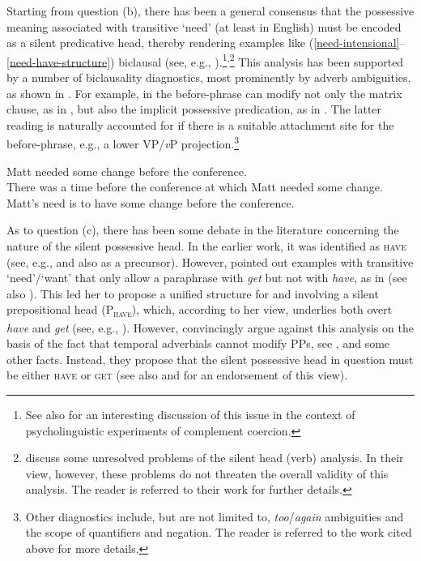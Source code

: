 \documentclass[output=paper]{langscibook}
\begin{document}
Starting from question (b), there has been a general consensus that the possessive meaning associated with transitive `need' (at least in English) must be encoded as a silent predicative head, thereby rendering examples like (\ref{need-intensional}--\ref{need-have-structure}) biclausal (see, e.g., \citealt{denDikken.Larson.Ludlow2018,Schwarz2006,Marusic.Zaucer2006,Harves2008,Zaroukian.Beller2013}).\footnote{See also \citet{Pylkkanen2008} for an interesting discussion of this issue in the context of psycho\-linguistic experiments of complement coercion.}\textsuperscript{,}\footnote{\citet{Marusic.Zaucer2006} discuss some unresolved problems of the silent head (verb) analysis. In their view, however, these problems do not threaten the overall validity of this analysis. The reader is referred to their work for further details.} This analysis has been supported by a number of biclausality diagnostics, most prominently by adverb ambiguities, as shown in . For example, in  the before-phrase can modify not only the matrix clause, as in , but also the implicit possessive predication, as in . The latter reading is naturally accounted for if there is a suitable attachment site for the before-phrase, e.g., a lower VP/\textit{v}P projection.\footnote{Other diagnostics include, but are not limited to, \textit{too}/\textit{again} ambiguities and the scope of quantifiers and negation. The reader is referred to the work cited above for more details.}

\ea\label{need-adverb} Matt needed some change before the conference.\\
\ea There was a time before the conference at which Matt needed some change.\label{need-adverb-high}\\
\ex Matt's need is to have some change before the conference.\label{need-adverb-low}\\
\hfill \citep[261]{Schwarz2006}
\z\z

\noindent As to question (c), there has been some debate in the literature concerning the nature of the silent possessive head. In the earlier work, it was identified as \textsc{have} (see, e.g., \citealt{denDikken.Larson.Ludlow2018} and also \citealt{Fodor.Lepore1998} as a precursor). However, \citet{Harley2004} pointed out examples with transitive `need'/`want' that only allow a paraphrase with \textit{get} but not with \textit{have}, as in  (see also \citealt{Harves2008}). This led her to propose a unified structure for  and  involving a silent prepositional head (P\textsubscript{\textsc{have}}), which, according to her view, underlies both overt \textit{have} and \textit{get} (see, e.g., \citealt{Harley2002}). However, \citet{Marusic.Zaucer2006} convincingly argue against this analysis on the basis of the fact that temporal adverbials cannot modify PPs, see , and some other facts. Instead, they propose that the silent possessive head in question must be either \textsc{have} or \textsc{get} (see also \citealt{Harves2008} and \citealt{Zaroukian.Beller2013} for an endorsement of this view).
\end{document}
